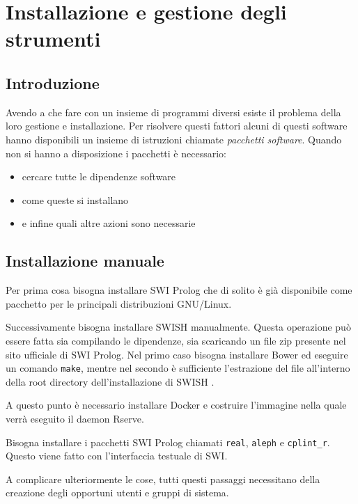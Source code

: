 \documentclass[10pt,titlepage,twoside,a4paper]{report}
\begin{document}

\chapter{Installazione e gestione degli strumenti} 
\label{ch:installazione-e-gestione-degli-strumenti}

\section{Introduzione}
Avendo a che fare con un insieme di programmi diversi esiste il problema della 
loro gestione e installazione. Per risolvere questi fattori alcuni di questi 
software hanno disponibili un insieme di istruzioni chiamate \emph{pacchetti 
software}.
Quando non si hanno a disposizione i pacchetti è necessario:
\begin{itemize}
    \item cercare tutte le dipendenze software
    \item come queste si installano
    \item e infine quali altre azioni sono necessarie
\end{itemize}

\section{Installazione manuale}
Per prima cosa bisogna installare SWI Prolog che di
solito è già disponibile come pacchetto per le principali distribuzioni 
GNU/Linux.

Successivamente bisogna installare SWISH manualmente. Questa operazione può 
essere fatta sia compilando le dipendenze, sia scaricando un file zip presente 
nel sito ufficiale di SWI Prolog. Nel primo caso bisogna installare Bower 
\cite{bower} ed eseguire un comando \texttt{make}, mentre nel secondo è 
sufficiente l'estrazione del file all'interno della root directory 
dell'installazione di SWISH \cite{swishManualInstallation}.

A questo punto è necessario installare Docker e costruire l'immagine nella 
quale verrà eseguito il daemon Rserve.

Bisogna installare i pacchetti SWI Prolog 
chiamati \texttt{real}, \texttt{aleph} e \texttt{cplint\_r}. Questo viene 
fatto con l'interfaccia testuale di SWI.

A complicare ulteriormente le cose, tutti questi passaggi necessitano della 
creazione degli opportuni utenti e gruppi di sistema.
\end{document}
